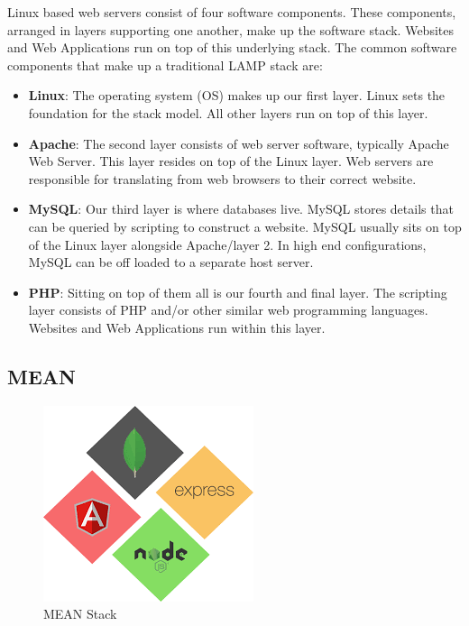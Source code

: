 \documentclass[12pt,a4paper,oneside]{report}
\begin{document}
\par 
Linux based web servers consist of four software components. These components, arranged in layers supporting one another, make up the software stack. Websites and Web Applications run on top of this underlying stack. The common software components that make up a traditional LAMP stack are\cite{lamp}:
\begin{itemize}
\item \textbf{Linux}: The operating system (OS) makes up our first layer. Linux sets the foundation for the stack model. All other layers run on top of this layer.
\item \textbf{Apache}: The second layer consists of web server software, typically Apache Web Server. This layer resides on top of the Linux layer. Web servers are responsible for translating from web browsers to their correct website.
\item \textbf{MySQL}: Our third layer is where databases live. MySQL stores details that can be queried by scripting to construct a website. MySQL usually sits on top of the Linux layer alongside Apache/layer 2. In high end configurations, MySQL can be off loaded to a separate host server.
\item \textbf{PHP}: Sitting on top of them all is our fourth and final layer. The scripting layer consists of PHP and/or other similar web programming languages. Websites and Web Applications run within this layer.
\end{itemize}

\subsection{MEAN}

\begin{figure}[H]
    \centering
    \includegraphics[scale=.7]{images/mean.png}
    \caption{MEAN Stack\cite{mean}}
\end{figure}
\end{document}
